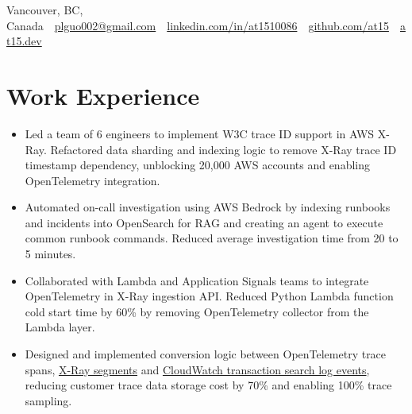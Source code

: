 \documentclass[11pt, letterpaper]{simple-cv}
\begin{document}
\centerline{
	Vancouver, BC, Canada\ \
	\href{plguo002@gmail.com}{plguo002@gmail.com}\ \
	\href{https://www.linkedin.com/in/at1510086}{linkedin.com/in/at1510086}\ \
	\href{https://github.com/at15}{github.com/at15}\ \
	\href{https://at15.dev}{at15.dev}\ \
}
\section{Work Experience}

\begin{itemize}
	\item Led a team of 6 engineers to implement W3C trace ID support in AWS X-Ray.
	Refactored data sharding and indexing logic to remove X-Ray trace ID timestamp dependency, unblocking 20,000 AWS accounts and enabling OpenTelemetry integration.
	\item Automated on-call investigation using AWS Bedrock by indexing runbooks and incidents into OpenSearch for RAG and creating an agent to execute common runbook commands. Reduced average investigation time from 20 to 5 minutes.
	\item Collaborated with Lambda and Application Signals teams to integrate OpenTelemetry in X-Ray ingestion API. Reduced Python Lambda function cold start time by 60\% by removing OpenTelemetry collector from the Lambda layer.
	\item Designed and implemented conversion logic between OpenTelemetry trace spans, 
	\href{https://docs.aws.amazon.com/xray/latest/devguide/xray-api-segmentdocuments.html}{X-Ray segments} and 
	\href{https://docs.aws.amazon.com/AmazonCloudWatch/latest/monitoring/CloudWatch-Transaction-Search.html}{CloudWatch transaction search log events},
	reducing customer trace data storage cost by 70\% and enabling 100\% trace sampling.
\end{itemize}
\end{document}
